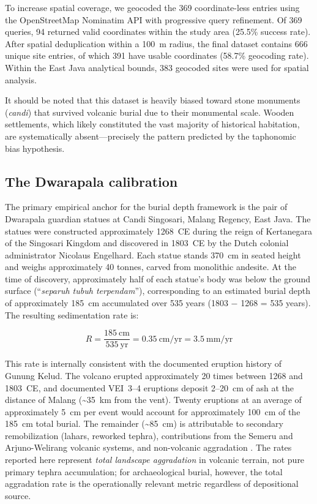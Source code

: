 \documentclass[12pt,a4paper]{article}
\begin{document}
To increase spatial coverage, we geocoded the 369 coordinate-less entries using the OpenStreetMap Nominatim API with progressive query refinement. Of 369 queries, 94 returned valid coordinates within the study area (25.5\% success rate). After spatial deduplication within a 100~m radius, the final dataset contains 666 unique site entries, of which 391 have usable coordinates (58.7\% geocoding rate). Within the East Java analytical bounds, 383 geocoded sites were used for spatial analysis.

It should be noted that this dataset is heavily biased toward stone monuments (\textit{candi}) that survived volcanic burial due to their monumental scale. Wooden settlements, which likely constituted the vast majority of historical habitation, are systematically absent---precisely the pattern predicted by the taphonomic bias hypothesis.

\subsection{The Dwarapala calibration}

The primary empirical anchor for the burial depth framework is the pair of Dwarapala guardian statues at Candi Singosari, Malang Regency, East Java. The statues were constructed approximately 1268~CE during the reign of Kertanegara of the Singosari Kingdom and discovered in 1803~CE by the Dutch colonial administrator Nicolaus Engelhard. Each statue stands 370~cm in seated height and weighs approximately 40 tonnes, carved from monolithic andesite. At the time of discovery, approximately half of each statue's body was below the ground surface (``\textit{separuh tubuh terpendam}''), corresponding to an estimated burial depth of approximately 185~cm accumulated over 535 years (1803 $-$ 1268 = 535 years). The resulting sedimentation rate is:

\begin{equation}
  R = \frac{185~\text{cm}}{535~\text{yr}} = 0.35~\text{cm/yr} = 3.5~\text{mm/yr}
\end{equation}

This rate is internally consistent with the documented eruption history of Gunung Kelud. The volcano erupted approximately 20 times between 1268 and 1803~CE, and documented VEI~3--4 eruptions deposit 2--20~cm of ash at the distance of Malang (\textasciitilde35~km from the vent). Twenty eruptions at an average of approximately 5~cm per event would account for approximately 100~cm of the 185~cm total burial. The remainder (\textasciitilde85~cm) is attributable to secondary remobilization (lahars, reworked tephra), contributions from the Semeru and Arjuno-Welirang volcanic systems, and non-volcanic aggradation \citep{gvp2024,maeno2019}. The rates reported here represent \textit{total landscape aggradation} in volcanic terrain, not pure primary tephra accumulation; for archaeological burial, however, the total aggradation rate is the operationally relevant metric regardless of depositional source.
\end{document}
